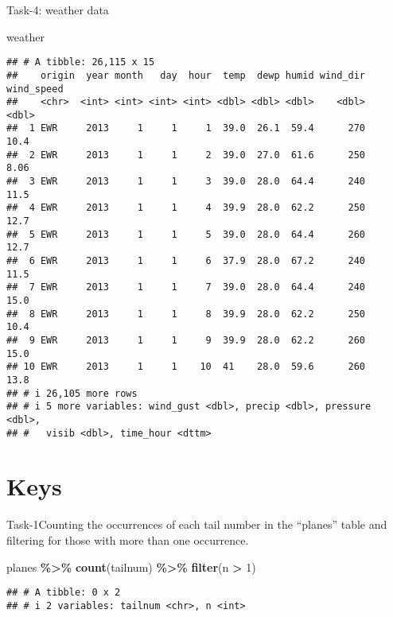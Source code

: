 \documentclass[
]{article}
\newenvironment{Shaded}{\begin{snugshade}}{\end{snugshade}}
\newcommand{\DecValTok}[1]{\textcolor[rgb]{0.00,0.00,0.81}{#1}}
\newcommand{\FunctionTok}[1]{\textcolor[rgb]{0.13,0.29,0.53}{\textbf{#1}}}
\newcommand{\NormalTok}[1]{#1}
\newcommand{\SpecialCharTok}[1]{\textcolor[rgb]{0.81,0.36,0.00}{\textbf{#1}}}
\begin{document}
Task-4: weather data

\begin{Shaded}
\begin{Highlighting}[]
\NormalTok{weather }
\end{Highlighting}
\end{Shaded}

\begin{verbatim}
## # A tibble: 26,115 x 15
##    origin  year month   day  hour  temp  dewp humid wind_dir wind_speed
##    <chr>  <int> <int> <int> <int> <dbl> <dbl> <dbl>    <dbl>      <dbl>
##  1 EWR     2013     1     1     1  39.0  26.1  59.4      270      10.4 
##  2 EWR     2013     1     1     2  39.0  27.0  61.6      250       8.06
##  3 EWR     2013     1     1     3  39.0  28.0  64.4      240      11.5 
##  4 EWR     2013     1     1     4  39.9  28.0  62.2      250      12.7 
##  5 EWR     2013     1     1     5  39.0  28.0  64.4      260      12.7 
##  6 EWR     2013     1     1     6  37.9  28.0  67.2      240      11.5 
##  7 EWR     2013     1     1     7  39.0  28.0  64.4      240      15.0 
##  8 EWR     2013     1     1     8  39.9  28.0  62.2      250      10.4 
##  9 EWR     2013     1     1     9  39.9  28.0  62.2      260      15.0 
## 10 EWR     2013     1     1    10  41    28.0  59.6      260      13.8 
## # i 26,105 more rows
## # i 5 more variables: wind_gust <dbl>, precip <dbl>, pressure <dbl>,
## #   visib <dbl>, time_hour <dttm>
\end{verbatim}

\hypertarget{keys}{%
\section{Keys}\label{keys}}

Task-1Counting the occurrences of each tail number in the ``planes''
table and filtering for those with more than one occurrence.

\begin{Shaded}
\begin{Highlighting}[]
\NormalTok{planes }\SpecialCharTok{\%\textgreater{}\%} 
  \FunctionTok{count}\NormalTok{(tailnum) }\SpecialCharTok{\%\textgreater{}\%} 
  \FunctionTok{filter}\NormalTok{(n }\SpecialCharTok{\textgreater{}} \DecValTok{1}\NormalTok{)}
\end{Highlighting}
\end{Shaded}

\begin{verbatim}
## # A tibble: 0 x 2
## # i 2 variables: tailnum <chr>, n <int>
\end{verbatim}
\end{document}

